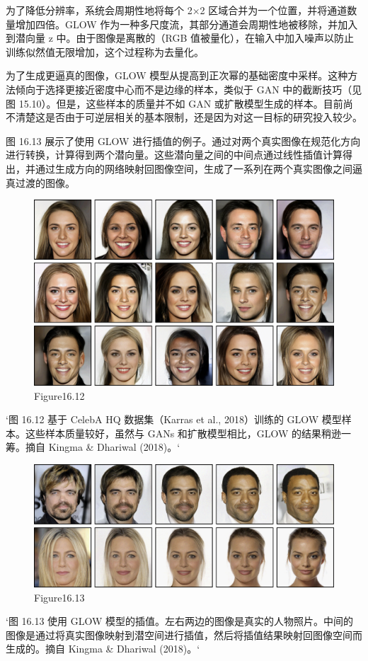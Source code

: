 为了降低分辨率，系统会周期性地将每个 2×2 区域合并为一个位置，并将通道数量增加四倍。GLOW 作为一种多尺度流，其部分通道会周期性地被移除，并加入到潜向量 z 中。由于图像是离散的（RGB 值被量化），在输入中加入噪声以防止训练似然值无限增加，这个过程称为去量化。

为了生成更逼真的图像，GLOW 模型从提高到正次幂的基础密度中采样。这种方法倾向于选择更接近密度中心而不是边缘的样本，类似于 GAN 中的截断技巧（见图 15.10）。但是，这些样本的质量并不如 GAN 或扩散模型生成的样本。目前尚不清楚这是否由于可逆层相关的基本限制，还是因为对这一目标的研究投入较少。

图 16.13 展示了使用 GLOW 进行插值的例子。通过对两个真实图像在规范化方向进行转换，计算得到两个潜向量。这些潜向量之间的中间点通过线性插值计算得出，并通过生成方向的网络映射回图像空间，生成了一系列在两个真实图像之间逼真过渡的图像。

\begin{figure}[h!]
\centering
\includegraphics[width=0.7\linewidth]{png/chapter16/FlowGLOWSamples.png}
\caption{Figure16.12}
\end{figure}

`图 16.12 基于 CelebA HQ 数据集（Karras et al., 2018）训练的 GLOW 模型样本。这些样本质量较好，虽然与 GANs 和扩散模型相比，GLOW 的结果稍逊一筹。摘自 Kingma & Dhariwal (2018)。`

\begin{figure}[h!]
\centering
\includegraphics[width=0.7\linewidth]{png/chapter16/FlowGLOWInterp.png}
\caption{Figure16.13}
\end{figure}

`图 16.13 使用 GLOW 模型的插值。左右两边的图像是真实的人物照片。中间的图像是通过将真实图像映射到潜空间进行插值，然后将插值结果映射回图像空间而生成的。摘自 Kingma & Dhariwal (2018)。`

